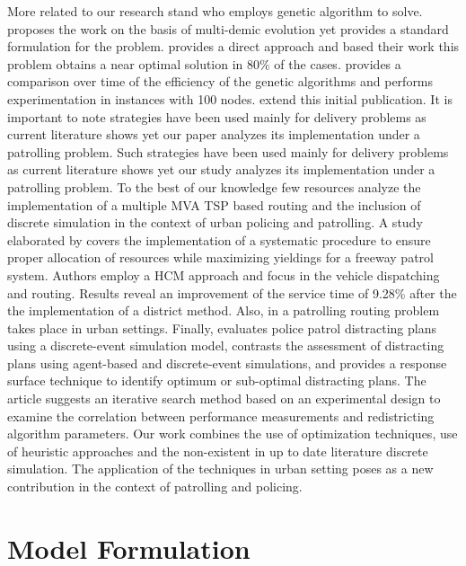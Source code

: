 \documentclass[preprint,review, 11pt,3p,authoryear]{elsarticle}
\begin{document}
More related to our research stand \cite{li_new_2013} who employs genetic algorithm to solve. \cite{kent_decentralised_2019} proposes the work on the basis of multi-demic evolution yet provides a standard formulation for the problem. \cite{kiraly_novel_2010} provides a direct approach and based their work this problem obtains a near optimal solution in 80\% of the cases. \cite{murray_using_nodate} provides a comparison over time of the efficiency of the genetic algorithms and performs experimentation in instances with 100 nodes. \cite{rexhepi_solving_nodate, xu_two_2018, jiang_new_2020} extend this initial publication. It is important to note strategies have been used mainly for delivery problems as current literature shows yet our paper analyzes its implementation under a patrolling problem. Such strategies have been used mainly for delivery problems as current literature shows yet our study analyzes its implementation under a patrolling problem. To the best of our knowledge few resources analyze the implementation of a multiple MVA TSP based routing and the inclusion of discrete simulation in the context of urban policing and patrolling. A study elaborated by \cite{wu_analysis_2014} covers the implementation of a systematic procedure to ensure proper allocation of resources while maximizing yieldings for a freeway patrol system. Authors employ a HCM approach and focus in the vehicle dispatching and routing. Results reveal an improvement of the service time of 9.28\% after the the implementation of a district method. Also, in \cite{luo_traffic_2019} a patrolling routing problem takes place in urban settings. Finally, \cite{zhang_simulation_2014} evaluates police patrol distracting plans using a discrete-event simulation model, contrasts the assessment of distracting plans using agent-based and discrete-event simulations, and provides a response surface technique to identify optimum or sub-optimal distracting plans. The article suggests an iterative search method based on an experimental design to examine the correlation between performance measurements and redistricting algorithm parameters. Our work combines the use of optimization techniques, use of heuristic approaches and the non-existent in up to date literature discrete simulation. The application of the techniques in urban setting  poses as a new contribution in the context of patrolling and policing.






\section{Model Formulation}
\label{model}
\end{document}
